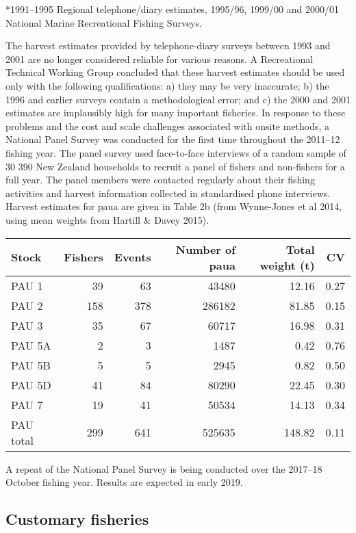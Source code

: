 \documentclass{mpi-plenary}
\theoremstyle{definition}
\theoremstyle{definition}
\theoremstyle{definition}
\theoremstyle{remark}
\begin{document}
*1991--1995 Regional telephone/diary estimates, 1995/96, 1999/00 and
2000/01 National Marine Recreational Fishing Surveys.

The harvest estimates provided by telephone-diary surveys between 1993
and 2001 are no longer considered reliable for various reasons. A
Recreational Technical Working Group concluded that these harvest
estimates should be used only with the following qualifications: a) they
may be very inaccurate; b) the 1996 and earlier surveys contain a
methodological error; and c) the 2000 and 2001 estimates are implausibly
high for many important fisheries. In response to these problems and the
cost and scale challenges associated with onsite methods, a National
Panel Survey was conducted for the first time throughout the 2011--12
fishing year. The panel survey used face-to-face interviews of a random
sample of 30 390 New Zealand households to recruit a panel of fishers
and non-fishers for a full year. The panel members were contacted
regularly about their fishing activities and harvest information
collected in standardised phone interviews. Harvest estimates for paua
are given in Table 2b (from Wynne-Jones et al 2014, using mean weights
from Hartill \& Davey 2015).

\begin{tabular}{l|r|r|r|r|r}
\hline
Stock & Fishers & Events & Number of paua & Total weight (t) & CV\\
\hline
PAU 1 & 39 & 63 & 43480 & 12.16 & 0.27\\
\hline
PAU 2 & 158 & 378 & 286182 & 81.85 & 0.15\\
\hline
PAU 3 & 35 & 67 & 60717 & 16.98 & 0.31\\
\hline
PAU 5A & 2 & 3 & 1487 & 0.42 & 0.76\\
\hline
PAU 5B & 5 & 5 & 2945 & 0.82 & 0.50\\
\hline
PAU 5D & 41 & 84 & 80290 & 22.45 & 0.30\\
\hline
PAU 7 & 19 & 41 & 50534 & 14.13 & 0.34\\
\hline
PAU total & 299 & 641 & 525635 & 148.82 & 0.11\\
\hline
\end{tabular}

A repeat of the National Panel Survey is being conducted over the
2017--18 October fishing year. Results are expected in early 2019.

\subsection{Customary fisheries}\label{customary-fisheries}
\end{document}
